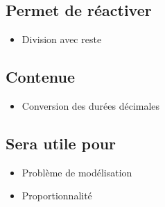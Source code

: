 \subsection{Permet de réactiver}
\begin{itemize}
    \item Division avec reste
\end{itemize}

\subsection{Contenue}
\begin{itemize}
    \item Conversion des durées décimales
\end{itemize}

\subsection{Sera utile pour}
\begin{itemize}
    \item Problème de modélisation
    \item Proportionnalité
\end{itemize}